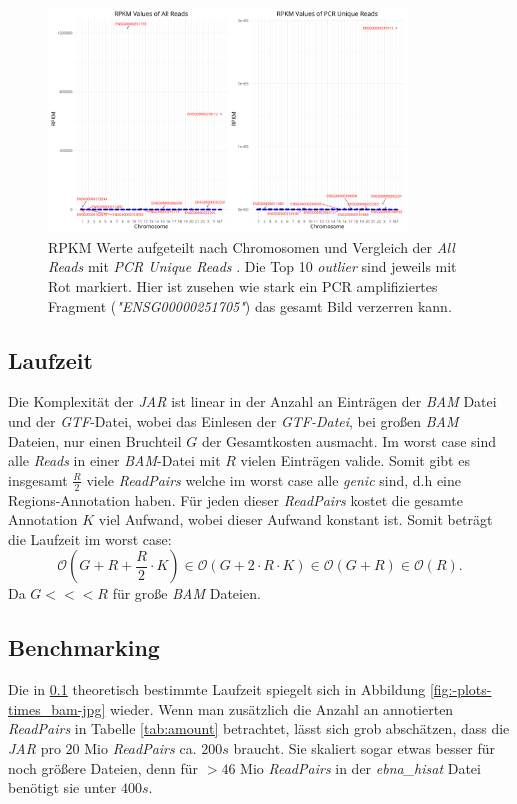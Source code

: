 \documentclass[12pt]{article}
\begin{document}
\begin{figure}[htpb]
    \centering
    \includegraphics[width=0.85\textwidth]{./plots/hes_star/Plots/rpkm_mplot.png}
    \caption{RPKM Werte aufgeteilt nach Chromosomen und Vergleich der \textit{All Reads} mit \textit{PCR Unique Reads} . Die Top 10 \textit{outlier} sind
    jeweils mit Rot markiert. Hier ist zusehen wie stark ein PCR amplifiziertes Fragment (\textit{"ENSG00000251705"}) das gesamt Bild verzerren kann.}
    \label{fig:scatter-log}
\end{figure}
\newpage

\subsection{Laufzeit}\label{sec:laufzeit}
Die Komplexität der \textit{JAR} ist linear in der Anzahl an Einträgen der \textit{BAM} Datei und der \textit{GTF}-Datei,
wobei das Einlesen der \textit{GTF-Datei}, bei gro\ss en \textit{BAM} Dateien,  nur einen Bruchteil $G$ der Gesamtkosten ausmacht.
Im worst case sind alle \textit{Reads} in einer \textit{BAM}-Datei mit $R$ vielen Einträgen valide. Somit gibt es insgesamt 
$\frac{R}{2}$ viele \textit{ReadPairs} welche im worst case alle \textit{genic} sind, d.h eine Regions-Annotation haben.
Für jeden dieser \textit{ReadPairs} kostet die gesamte Annotation $K$ viel Aufwand, wobei dieser Aufwand konstant ist.
Somit beträgt die Laufzeit im worst case:
\[
    \mathcal{O}(G + R + \frac{R}{2} \cdot K) \in \mathcal{O}(G + 2 \cdot R \cdot K) \in \mathcal{O}(G+R) \in \mathcal{O}(R)
.\]
Da $G <<< R$ für gro\ss e \textit{BAM} Dateien.
\subsection{Benchmarking}
Die in \ref{sec:laufzeit} theoretisch bestimmte Laufzeit spiegelt sich in Abbildung \ref{fig:-plots-times_bam-jpg} wieder.
Wenn man zusätzlich die Anzahl an annotierten \textit{ReadPairs} in Tabelle \ref{tab:amount} betrachtet, lässt sich grob 
abschätzen, dass die \textit{JAR} pro $20$ Mio \textit{ReadPairs} ca. $200s$ braucht. Sie skaliert sogar etwas besser
für noch grö\ss ere Dateien, denn für $>46$ Mio \textit{ReadPairs} in der \textit{ebna\_hisat} Datei benötigt sie 
unter $400s$.
\end{document}
